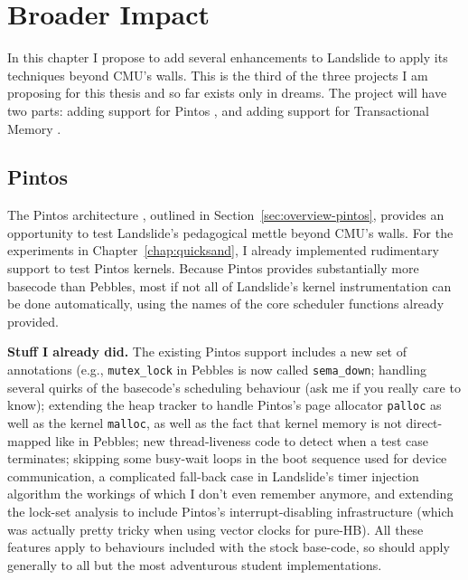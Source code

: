\chapter{Broader Impact}
\label{chap:lipservice}

In this chapter I propose to add several enhancements to Landslide to apply its techniques beyond CMU's walls.
This is the third of the three projects I am proposing for this thesis and so far exists only in dreams.
The project will have two parts: adding support for Pintos \cite{pintos}, and adding support for Transactional Memory \cite{transactional-memory}.

\section{Pintos}

The Pintos architecture \cite{pintos}, outlined in Section~\ref{sec:overview-pintos}, provides an opportunity to test Landslide's pedagogical mettle beyond CMU's walls.
For the experiments in Chapter~\ref{chap:quicksand}, I already implemented rudimentary support to test Pintos kernels.
Because Pintos provides substantially more basecode than Pebbles, most if not all of Landslide's kernel instrumentation can be done automatically,
using the names of the core scheduler functions already provided.

{\bf Stuff I already did.}
The existing Pintos support includes
a new set of annotations (e.g., {\tt mutex\_lock} in Pebbles is now called {\tt sema\_down};
handling several quirks of the basecode's scheduling behaviour (ask me if you really care to know);
extending the heap tracker to handle Pintos's page allocator {\tt palloc} as well as the kernel {\tt malloc},
as well as the fact that kernel memory is not direct-mapped like in Pebbles;
new thread-liveness code to detect when a test case terminates;
skipping some busy-wait loops in the boot sequence used for device communication,
a complicated fall-back case in Landslide's timer injection algorithm the workings of which I don't even remember anymore,
and extending the lock-set analysis to include Pintos's interrupt-disabling infrastructure (which was actually pretty tricky when using vector clocks for pure-HB).
All these features apply to behaviours included with the stock base-code, so should apply generally to all but the most adventurous student implementations.

